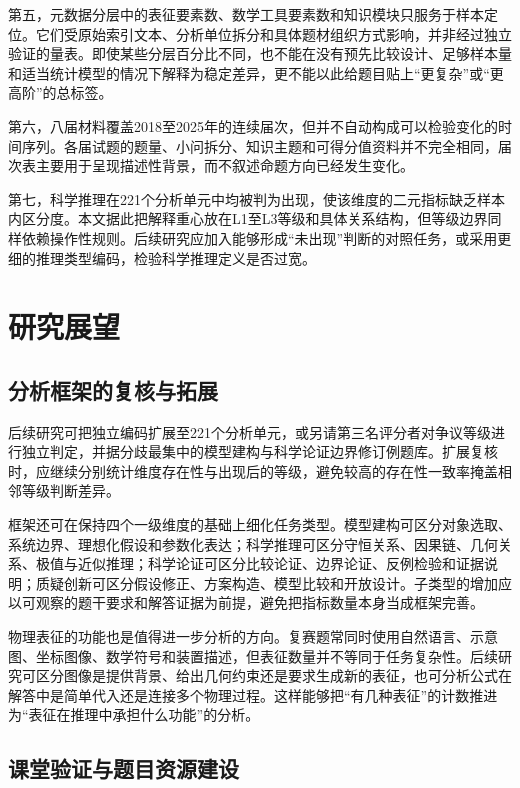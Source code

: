 \documentclass[
  12pt,
  a4paper,twoside,openany]{ctexbook}
\begin{document}
第五，元数据分层中的表征要素数、数学工具要素数和知识模块只服务于样本定位。它们受原始索引文本、分析单位拆分和具体题材组织方式影响，并非经过独立验证的量表。即使某些分层百分比不同，也不能在没有预先比较设计、足够样本量和适当统计模型的情况下解释为稳定差异，更不能以此给题目贴上``更复杂''或``更高阶''的总标签。

第六，八届材料覆盖2018至2025年的连续届次，但并不自动构成可以检验变化的时间序列。各届试题的题量、小问拆分、知识主题和可得分值资料并不完全相同，届次表主要用于呈现描述性背景，而不叙述命题方向已经发生变化。

第七，科学推理在221个分析单元中均被判为出现，使该维度的二元指标缺乏样本内区分度。本文据此把解释重心放在L1至L3等级和具体关系结构，但等级边界同样依赖操作性规则。后续研究应加入能够形成``未出现''判断的对照任务，或采用更细的推理类型编码，检验科学推理定义是否过宽。

\section{研究展望}\label{ux7814ux7a76ux5c55ux671b}

\subsection{分析框架的复核与拓展}\label{ux5206ux6790ux6846ux67b6ux7684ux590dux6838ux4e0eux62d3ux5c55}

后续研究可把独立编码扩展至221个分析单元，或另请第三名评分者对争议等级进行独立判定，并据分歧最集中的模型建构与科学论证边界修订例题库。扩展复核时，应继续分别统计维度存在性与出现后的等级，避免较高的存在性一致率掩盖相邻等级判断差异。

框架还可在保持四个一级维度的基础上细化任务类型。模型建构可区分对象选取、系统边界、理想化假设和参数化表达；科学推理可区分守恒关系、因果链、几何关系、极值与近似推理；科学论证可区分比较论证、边界论证、反例检验和证据说明；质疑创新可区分假设修正、方案构造、模型比较和开放设计。子类型的增加应以可观察的题干要求和解答证据为前提，避免把指标数量本身当成框架完善。

物理表征的功能也是值得进一步分析的方向。复赛题常同时使用自然语言、示意图、坐标图像、数学符号和装置描述，但表征数量并不等同于任务复杂性。后续研究可区分图像是提供背景、给出几何约束还是要求生成新的表征，也可分析公式在解答中是简单代入还是连接多个物理过程。这样能够把``有几种表征''的计数推进为``表征在推理中承担什么功能''的分析。

\subsection{课堂验证与题目资源建设}\label{ux8bfeux5802ux9a8cux8bc1ux4e0eux9898ux76eeux8d44ux6e90ux5efaux8bbe}
\end{document}
